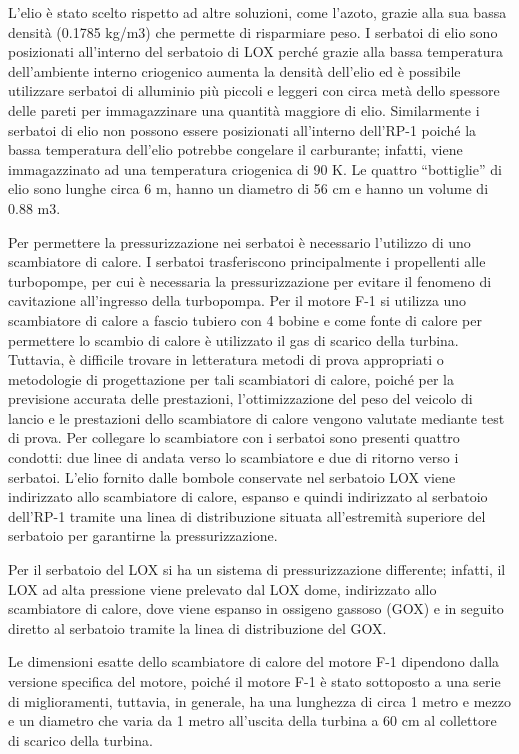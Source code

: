L’elio è stato scelto rispetto ad altre soluzioni, come l’azoto, grazie alla sua bassa densità (0.1785 kg/m3) che permette di risparmiare peso.
I serbatoi di elio sono posizionati all’interno del serbatoio di LOX perché grazie alla bassa temperatura dell’ambiente interno criogenico aumenta la densità dell’elio ed è possibile utilizzare serbatoi di alluminio più piccoli e leggeri con circa metà dello spessore delle pareti per immagazzinare una quantità maggiore di elio.
Similarmente i serbatoi di elio non possono essere posizionati all’interno dell’RP-1 poiché la bassa temperatura dell’elio potrebbe congelare il carburante; infatti, viene immagazzinato ad una temperatura criogenica di 90 K.
Le quattro “bottiglie” di elio sono lunghe circa 6 m, hanno un diametro di 56 cm e hanno un volume di 0.88 m3.

Per permettere la pressurizzazione nei serbatoi è necessario l’utilizzo di uno scambiatore di calore.
I serbatoi trasferiscono principalmente i propellenti alle turbopompe, per cui è necessaria la pressurizzazione per evitare il fenomeno di cavitazione all'ingresso della turbopompa. 
Per il motore F-1 si utilizza uno scambiatore di calore a fascio tubiero con 4 bobine e come fonte di calore per permettere lo scambio di calore è utilizzato il gas di scarico della turbina.
Tuttavia, è difficile trovare in letteratura metodi di prova appropriati o metodologie di progettazione per tali scambiatori di calore, poiché per la previsione accurata delle prestazioni, l'ottimizzazione del peso del veicolo di lancio e le prestazioni dello scambiatore di calore vengono valutate mediante test di prova. 
Per collegare lo scambiatore con i serbatoi sono presenti quattro condotti: due linee di andata verso lo scambiatore e due di ritorno verso i serbatoi.
L'elio fornito dalle bombole conservate nel serbatoio LOX viene indirizzato allo scambiatore di calore, espanso e quindi indirizzato al serbatoio dell’RP-1 tramite una linea di distribuzione situata all'estremità superiore del serbatoio per garantirne la pressurizzazione. 

Per il serbatoio del LOX si ha un sistema di pressurizzazione differente; infatti, il LOX ad alta pressione viene prelevato dal LOX dome, indirizzato allo scambiatore di calore, dove viene espanso in ossigeno gassoso (GOX) e in seguito diretto al serbatoio tramite la linea di distribuzione del GOX.

Le dimensioni esatte dello scambiatore di calore del motore F-1 dipendono dalla versione specifica del motore, poiché il motore F-1 è stato sottoposto a una serie di miglioramenti, tuttavia, in generale, ha una lunghezza di circa 1 metro e mezzo e un diametro che varia da 1 metro all'uscita della turbina a 60 cm al collettore di scarico della turbina. 


